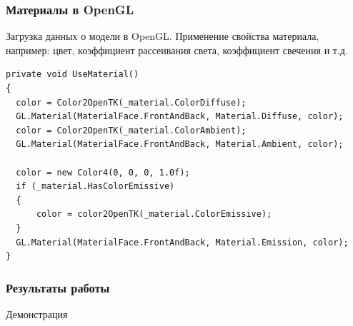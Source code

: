 \documentclass{beamer}
\begin{document}
\begin{frame}[fragile]
\frametitle{Материалы в OpenGL}
	Загрузка данных о модели в OpenGL.
    Применение свойства материала, например: цвет, коэффициент рассеивания света, коэффициент свечения и т.д.
    
\begin{scriptsize}
\begin{lstlisting}
private void UseMaterial()
{
  color = Color2OpenTK(_material.ColorDiffuse);  
  GL.Material(MaterialFace.FrontAndBack, Material.Diffuse, color);  
  color = Color2OpenTK(_material.ColorAmbient);
  GL.Material(MaterialFace.FrontAndBack, Material.Ambient, color);

  color = new Color4(0, 0, 0, 1.0f);
  if (_material.HasColorEmissive)
  {
      color = color2OpenTK(_material.ColorEmissive);              
  }
  GL.Material(MaterialFace.FrontAndBack, Material.Emission, color);
}
\end{lstlisting}
\end{scriptsize}
  
\end{frame}





\begin{frame}
\frametitle{Результаты работы}
    \begin{center}            
    \begin{large}
    Демонстрация
    \end{large}
    \end{center}
\end{frame}
\end{document}
